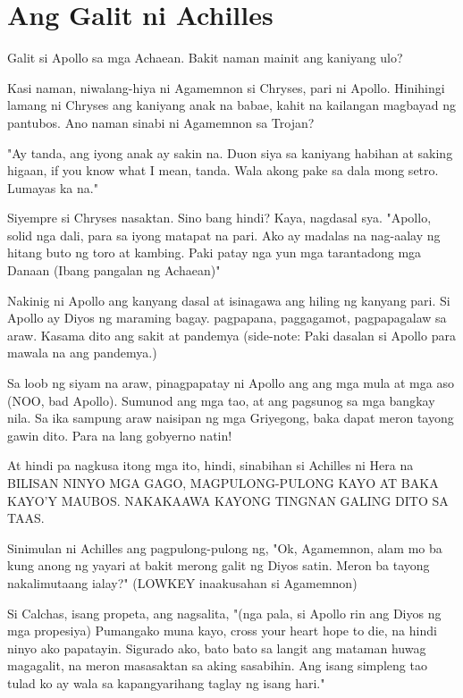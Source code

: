 \documentclass[12pt,letterpaper]{report}
\begin{document}
\chapter{Ang Galit ni Achilles}

Galit si Apollo sa mga Achaean. Bakit naman mainit ang kaniyang ulo?


Kasi naman, niwalang-hiya ni Agamemnon si Chryses, pari ni Apollo. Hinihingi lamang ni Chryses ang kaniyang anak na babae,
kahit na kailangan magbayad ng pantubos. Ano naman sinabi ni Agamemnon sa Trojan?

"Ay tanda, ang iyong anak ay sakin na. Duon siya sa kaniyang habihan at saking higaan,
if you know what I mean, tanda. Wala akong pake sa dala mong setro. Lumayas ka na."

Siyempre si Chryses nasaktan. Sino bang hindi? Kaya, nagdasal sya.
"Apollo, solid nga dali, para sa iyong matapat na pari. Ako ay madalas na nag-aalay ng hitang buto ng toro at kambing.
Paki patay nga yun mga tarantadong mga Danaan (Ibang pangalan ng Achaean)"

Nakinig ni Apollo ang kanyang dasal at isinagawa ang hiling ng kanyang pari.
Si Apollo ay Diyos ng maraming bagay. pagpapana, paggagamot, pagpapagalaw sa araw.
Kasama dito ang sakit at pandemya (side-note: Paki dasalan si Apollo para mawala na ang pandemya.)

Sa loob ng siyam na araw, pinagpapatay ni Apollo ang ang mga mula at mga aso (NOO, bad Apollo).
Sumunod ang mga tao, at ang pagsunog sa mga bangkay nila. Sa ika sampung araw naisipan ng mga Griyegong,
baka dapat meron tayong gawin dito. Para na lang gobyerno natin!

At hindi pa nagkusa itong mga ito, hindi, sinabihan si Achilles ni Hera na BILISAN NINYO MGA GAGO,
MAGPULONG-PULONG KAYO AT BAKA KAYO'Y MAUBOS. NAKAKAAWA KAYONG TINGNAN GALING DITO SA TAAS.

Sinimulan ni Achilles ang pagpulong-pulong ng, "Ok, Agamemnon, alam mo ba kung anong ng yayari at bakit merong galit ng Diyos satin.
Meron ba tayong nakalimutaang ialay?" (LOWKEY inaakusahan si Agamemnon)

Si Calchas, isang propeta, ang nagsalita,
"(nga pala, si Apollo rin ang Diyos ng mga propesiya) Pumangako muna kayo,
cross your heart hope to die, na hindi ninyo ako papatayin. Sigurado ako, bato bato sa langit ang mataman huwag magagalit,
na meron masasaktan sa aking sasabihin. Ang isang simpleng tao tulad ko ay wala sa kapangyarihang taglay ng isang hari."
\end{document}
